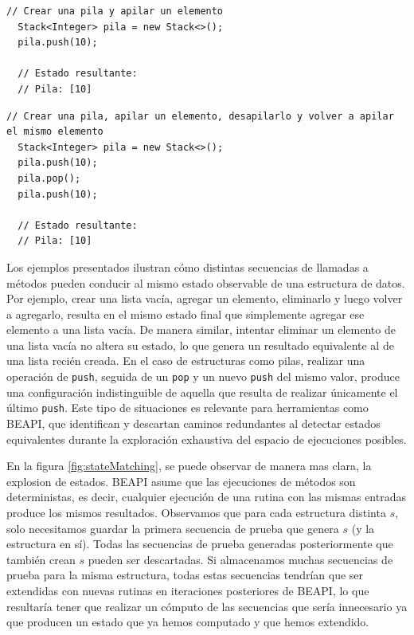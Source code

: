 \begin{lstlisting}[numbers=none, caption={Crear una pila y apilar un elemento}, label={lst:push}, captionpos=b, frame=tb, basicstyle=\scriptsize]
  // Crear una pila y apilar un elemento
  Stack<Integer> pila = new Stack<>();
  pila.push(10);

  // Estado resultante:
  // Pila: [10]
\end{lstlisting}

\vspace{1em}

\begin{lstlisting}[numbers=none, caption={Push, pop y nuevo push en una pila}, label={lst:push-pop-push}, captionpos=b, frame=tb, basicstyle=\scriptsize]
  // Crear una pila, apilar un elemento, desapilarlo y volver a apilar el mismo elemento
  Stack<Integer> pila = new Stack<>();
  pila.push(10);
  pila.pop();
  pila.push(10);

  // Estado resultante:
  // Pila: [10]
\end{lstlisting}  

Los ejemplos presentados ilustran cómo distintas secuencias de llamadas a métodos pueden conducir al mismo estado observable de una estructura de datos. 
Por ejemplo, crear una lista vacía, agregar un elemento, eliminarlo y luego volver a agregarlo, resulta en el mismo estado final que simplemente agregar ese elemento a una lista vacía. 
De manera similar, intentar eliminar un elemento de una lista vacía no altera su estado, lo que genera un resultado equivalente al de una lista recién creada.
En el caso de estructuras como pilas, realizar una operación de \texttt{push}, seguida de un \texttt{pop} y un nuevo \texttt{push} del mismo valor, 
produce una configuración indistinguible de aquella que resulta de realizar únicamente el último \texttt{push}. 
Este tipo de situaciones es relevante para herramientas como \textsf{BEAPI}, 
que identifican y descartan caminos redundantes al detectar estados equivalentes durante la exploración exhaustiva del espacio de ejecuciones posibles.

En la figura \ref{fig:stateMatching}, se puede observar de manera mas clara, la explosion de estados.
\textsf{BEAPI} asume que las ejecuciones de métodos son deterministas, es decir, cualquier ejecución de una rutina con las mismas entradas produce los mismos resultados. 
Observamos que para cada estructura distinta $s$, solo necesitamos guardar la primera secuencia de prueba que genera $s$ (y la estructura en sí).
Todas las secuencias de prueba generadas posteriormente que también crean $s$ pueden ser descartadas. 
Si almacenamos muchas secuencias de prueba para la misma estructura, todas estas secuencias tendrían que ser extendidas con nuevas rutinas en iteraciones posteriores de \textsf{BEAPI}, 
lo que resultaría tener que realizar un cómputo de las secuencias que sería innecesario ya que producen un estado que ya hemos computado y que hemos extendido.  

